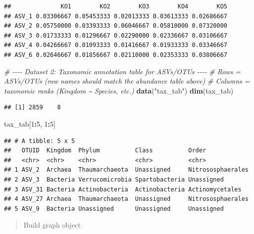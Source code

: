 \documentclass[
]{book}
\newenvironment{Shaded}{\begin{snugshade}}{\end{snugshade}}
\newcommand{\CommentTok}[1]{\textcolor[rgb]{0.56,0.35,0.01}{\textit{#1}}}
\newcommand{\DecValTok}[1]{\textcolor[rgb]{0.00,0.00,0.81}{#1}}
\newcommand{\FunctionTok}[1]{\textcolor[rgb]{0.13,0.29,0.53}{\textbf{#1}}}
\newcommand{\NormalTok}[1]{#1}
\newcommand{\SpecialCharTok}[1]{\textcolor[rgb]{0.81,0.36,0.00}{\textbf{#1}}}
\newcommand{\StringTok}[1]{\textcolor[rgb]{0.31,0.60,0.02}{#1}}
\begin{document}
\begin{verbatim}
##              KO1        KO2        KO3        KO4        KO5
## ASV_1 0.03306667 0.05453333 0.02013333 0.03613333 0.02686667
## ASV_2 0.05750000 0.03393333 0.06046667 0.05810000 0.07320000
## ASV_3 0.01733333 0.01296667 0.02290000 0.02336667 0.03106667
## ASV_4 0.04266667 0.01093333 0.01416667 0.01933333 0.03346667
## ASV_6 0.02646667 0.01856667 0.02110000 0.02353333 0.03806667
\end{verbatim}

\begin{Shaded}
\begin{Highlighting}[]
\CommentTok{\# {-}{-}{-}{-} Dataset 2: Taxonomic annotation table for ASVs/OTUs {-}{-}{-}{-}}
\CommentTok{\# Rows = ASVs/OTUs (row names should match the abundance table above)}
\CommentTok{\# Columns = taxonomic ranks (Kingdom \textasciitilde{} Species, etc.)}
\FunctionTok{data}\NormalTok{(}\StringTok{"tax\_tab"}\NormalTok{)}
\FunctionTok{dim}\NormalTok{(tax\_tab)}
\end{Highlighting}
\end{Shaded}

\begin{verbatim}
## [1] 2859    8
\end{verbatim}

\begin{Shaded}
\begin{Highlighting}[]
\NormalTok{tax\_tab[}\DecValTok{1}\SpecialCharTok{:}\DecValTok{5}\NormalTok{, }\DecValTok{1}\SpecialCharTok{:}\DecValTok{5}\NormalTok{]}
\end{Highlighting}
\end{Shaded}

\begin{verbatim}
## # A tibble: 5 x 5
##   OTUID  Kingdom  Phylum          Class          Order            
##   <chr>  <chr>    <chr>           <chr>          <chr>            
## 1 ASV_2  Archaea  Thaumarchaeota  Unassigned     Nitrososphaerales
## 2 ASV_3  Bacteria Verrucomicrobia Spartobacteria Unassigned       
## 3 ASV_31 Bacteria Actinobacteria  Actinobacteria Actinomycetales  
## 4 ASV_27 Archaea  Thaumarchaeota  Unassigned     Nitrososphaerales
## 5 ASV_9  Bacteria Unassigned      Unassigned     Unassigned
\end{verbatim}

\begin{quote}
Build graph object
\end{quote}
\end{document}
